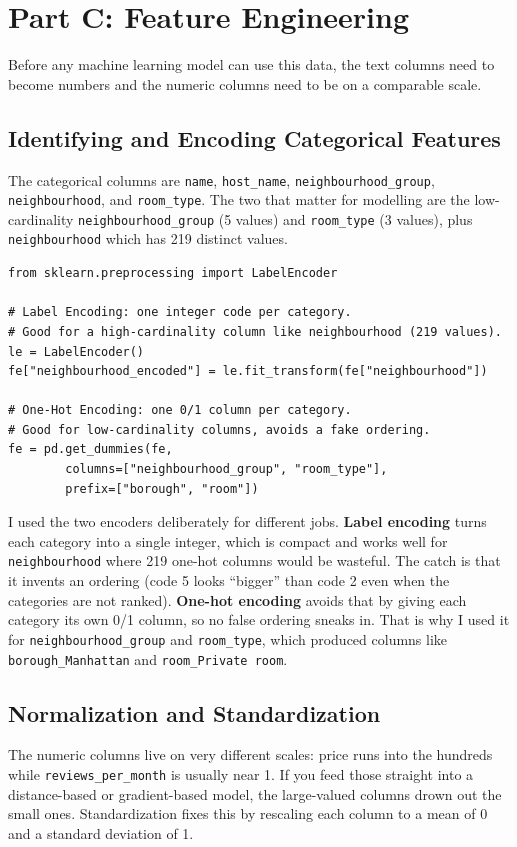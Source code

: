 \documentclass[11pt,a4paper]{article}
\begin{document}
\section*{Part C: Feature Engineering}
Before any machine learning model can use this data, the text columns need to become numbers and the numeric columns need to be on a comparable scale.

\subsection*{Identifying and Encoding Categorical Features}
The categorical columns are \texttt{name}, \texttt{host\_name}, \texttt{neighbourhood\_group}, \texttt{neighbourhood}, and \texttt{room\_type}. The two that matter for modelling are the low-cardinality \texttt{neighbourhood\_group} (5 values) and \texttt{room\_type} (3 values), plus \texttt{neighbourhood} which has 219 distinct values.

\begin{lstlisting}[style=py, caption={Label encoding and one-hot encoding.}]
from sklearn.preprocessing import LabelEncoder

# Label Encoding: one integer code per category.
# Good for a high-cardinality column like neighbourhood (219 values).
le = LabelEncoder()
fe["neighbourhood_encoded"] = le.fit_transform(fe["neighbourhood"])

# One-Hot Encoding: one 0/1 column per category.
# Good for low-cardinality columns, avoids a fake ordering.
fe = pd.get_dummies(fe,
        columns=["neighbourhood_group", "room_type"],
        prefix=["borough", "room"])
\end{lstlisting}

I used the two encoders deliberately for different jobs. \textbf{Label encoding} turns each category into a single integer, which is compact and works well for \texttt{neighbourhood} where 219 one-hot columns would be wasteful. The catch is that it invents an ordering (code 5 looks ``bigger'' than code 2 even when the categories are not ranked). \textbf{One-hot encoding} avoids that by giving each category its own 0/1 column, so no false ordering sneaks in. That is why I used it for \texttt{neighbourhood\_group} and \texttt{room\_type}, which produced columns like \texttt{borough\_Manhattan} and \texttt{room\_Private room}.

\subsection*{Normalization and Standardization}
The numeric columns live on very different scales: price runs into the hundreds while \texttt{reviews\_per\_month} is usually near 1. If you feed those straight into a distance-based or gradient-based model, the large-valued columns drown out the small ones. Standardization fixes this by rescaling each column to a mean of 0 and a standard deviation of 1.
\end{document}
